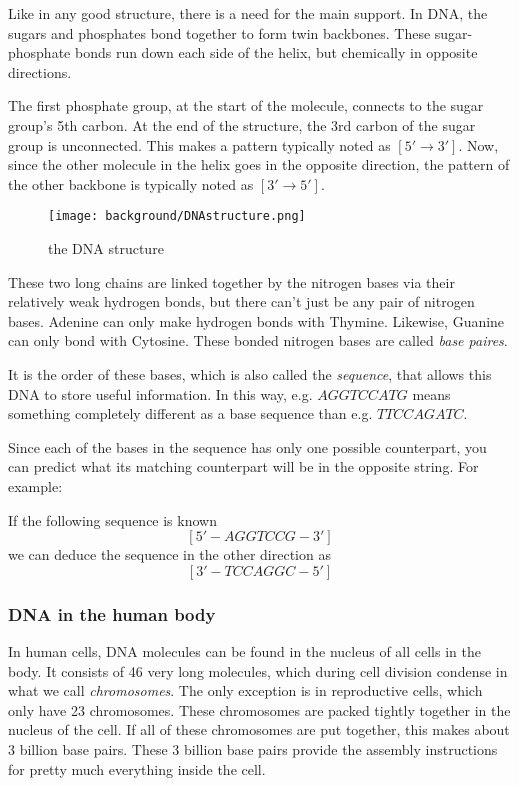Like in any good structure, there is a need for the main support. In DNA, the sugars and phosphates bond together to form twin backbones. These sugar-phosphate bonds run down each side of the helix, but chemically in opposite directions. 

The first phosphate group, at the start of the molecule, connects to the sugar group's 5th carbon. At the end of the structure, the 3rd carbon of the sugar group is unconnected. This makes a pattern typically noted as $[5' \rightarrow 3']$. Now, since the other molecule in the helix goes in the opposite direction, the pattern of the other backbone is typically noted as $[3' \rightarrow 5']$.

\begin{figure}[H]
	\centering
	\texttt{[image: background/DNAstructure.png]}
	\caption{the DNA structure}
	\label{fig:DNAstructure}
\end{figure}

These two long chains are linked together by the nitrogen bases via their relatively weak hydrogen bonds, but there can't just be any pair of nitrogen bases. Adenine can only make hydrogen bonds with Thymine. Likewise, Guanine can only bond with Cytosine. These bonded nitrogen bases are called \emph{base paires}.

It is the order of these bases, which is also called the \emph{sequence}, that allows this DNA to store useful information. In this way, e.g. $AGGTCCATG$ means something completely different as a base sequence than e.g. $TTCCAGATC$.

Since each of the bases in the sequence has only one possible counterpart, you can predict what its matching counterpart will be in the opposite string. For example:

If the following sequence is known
$$[5' - AGGTCCG - 3']$$
we can deduce the sequence in the other direction as
$$[3' - TCCAGGC - 5']$$

\subsubsection{DNA in the human body}

In human cells, DNA molecules can be found in the nucleus of all cells in the body. It consists of 46 very long molecules, which during cell division condense in what we call \emph{chromosomes}. The only exception is in reproductive cells, which only have 23 chromosomes. These chromosomes are packed tightly together in the nucleus of the cell. If all of these chromosomes are put together, this makes about 3 billion base pairs. These 3 billion base pairs provide the assembly instructions for pretty much everything inside the cell.

